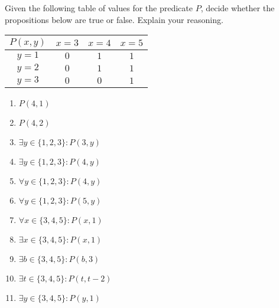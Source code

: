 	\begin{xca}
	
	Given the following table of values for the predicate $P$, decide whether the propositions below are true or false.  Explain your reasoning.
	
	\begin{table}[h!]
		\begin{center}
			\label{tab:table1}
			\begin{tabular}{c|c|c|c|}
				$P(x,y)$ &$x=3$ & $x=4$ & $x=5$  \\
				\hline
				$y=1$    &   $0$        &     $1$       &     $1$      \\
				\hline
				$y=2$   &    $0$       &     $1$        &    $1$      \\
				\hline
				$y=3$   &    $0$       &      $0$        &   $1$       \\
				\hline
			\end{tabular}
		\end{center}
	\end{table}
	
	\begin{enumerate}
		\item $P(4,1)$
		\item $P(4,2)$
		\item $\exists y \in \{1,2,3\}: P(3,y)$
		\item $\exists y  \in \{1,2,3\}: P(4,y)$
		\item $\forall y  \in \{1,2,3\}: P(4,y)$
		\item $\forall y  \in \{1,2,3\}: P(5,y)$
		\item $\forall x  \in \{3,4,5\}: P(x, 1)$
		\item $\exists x  \in \{3,4,5\}: P(x,1)$
		\item $\exists b  \in \{3,4,5\}: P(b, 3)$
		\item $\exists t  \in \{3,4,5\}: P(t, t-2)$
		\item $\exists y  \in \{3,4,5\}: P(y,1)$
	\end{enumerate}
	
	
\end{xca}

